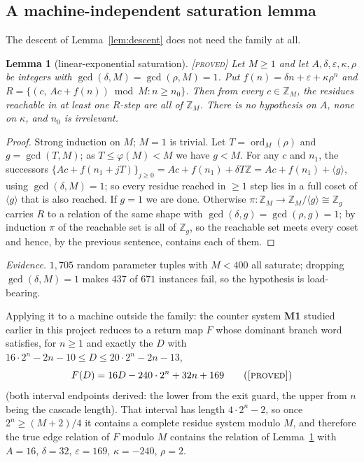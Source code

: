\documentclass[11pt]{article}
\newtheorem{lemma}[theorem]{Lemma}
\theoremstyle{definition}
\theoremstyle{remark}
\newcommand{\Z}{\mathbb{Z}}
\newcommand{\ord}{\operatorname{ord}}
\newcommand{\Proved}{\textsc{[proved]}}
\begin{document}
\subsection{A machine-independent saturation lemma}
\label{sec:t16}

The descent of Lemma~\ref{lem:descent} does not need the family at all.

\begin{lemma}[linear-exponential saturation]\label{lem:t16}
\Proved\; Let $M\ge1$ and let $A,\delta,\varepsilon,\kappa,\rho$ be integers
with $\gcd(\delta,M)=\gcd(\rho,M)=1$.  Put $f(n)=\delta n+\varepsilon+
\kappa\rho^n$ and $R=\{(c,\,Ac+f(n))\bmod M: n\ge n_0\}$.  Then from every
$c\in\Z_M$, the residues reachable in at least one $R$-step are all of $\Z_M$.
There is no hypothesis on $A$, none on $\kappa$, and $n_0$ is irrelevant.
\end{lemma}

\begin{proof}
Strong induction on $M$; $M=1$ is trivial.  Let $T=\ord_M(\rho)$ and
$g=\gcd(T,M)$; as $T\le\varphi(M)<M$ we have $g<M$.  For any $c$ and $n_1$,
the successors $\{Ac+f(n_1+jT)\}_{j\ge0}=Ac+f(n_1)+\delta T\Z=
Ac+f(n_1)+\langle g\rangle$, using $\gcd(\delta,M)=1$; so every residue
reached in $\ge1$ step lies in a full coset of $\langle g\rangle$ that is also
reached.  If $g=1$ we are done.  Otherwise $\pi:\Z_M\to\Z_M/\langle g\rangle
\cong\Z_g$ carries $R$ to a relation of the same shape with
$\gcd(\delta,g)=\gcd(\rho,g)=1$; by induction $\pi$ of the reachable set is
all of $\Z_g$, so the reachable set meets every coset and hence, by the
previous sentence, contains each of them.
\end{proof}

\emph{Evidence.}  $1{,}705$ random parameter tuples with $M<400$ all saturate;
dropping $\gcd(\delta,M)=1$ makes $437$ of $671$ instances fail, so the
hypothesis is load-bearing.

Applying it to a machine outside the family: the counter system \textbf{M1}
studied earlier in this project reduces to a return map $F$ whose dominant
branch word satisfies, for $n\ge1$ and exactly the $D$ with
$16\cdot2^n-2n-10\le D\le 20\cdot2^n-2n-13$,
\[
F(D)=16D-240\cdot2^n+32n+169 \tag{\Proved}
\]
(both interval endpoints derived: the lower from the exit guard, the upper
from $n$ being the cascade length).  That interval has length $4\cdot2^n-2$,
so once $2^n\ge(M+2)/4$ it contains a complete residue system modulo $M$, and
therefore the true edge relation of $F$ modulo $M$ contains the relation of
Lemma~\ref{lem:t16} with $A=16$, $\delta=32$, $\varepsilon=169$,
$\kappa=-240$, $\rho=2$.
\end{document}
